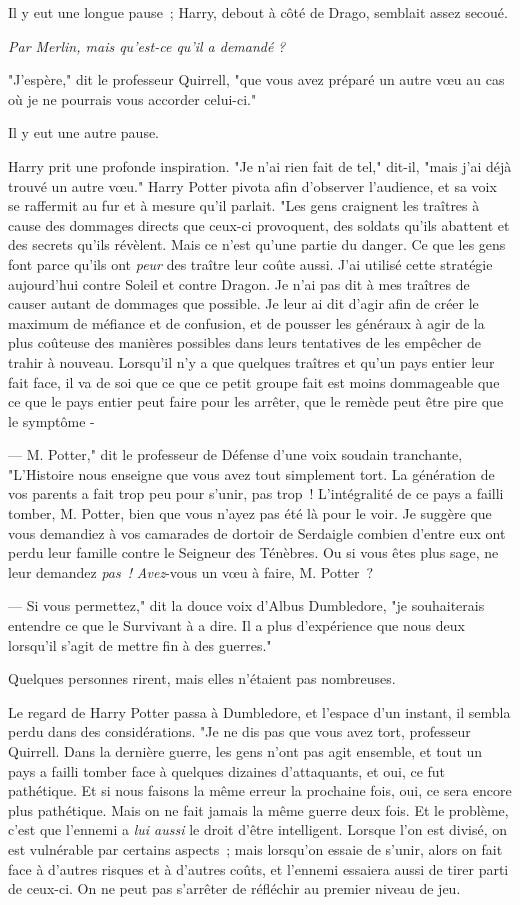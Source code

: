 Il y eut une longue pause~; Harry, debout à côté de Drago, semblait assez secoué.

\emph{Par Merlin, mais qu'est-ce qu'il a demandé} \emph{?}

"J'espère," dit le professeur Quirrell, "que vous avez préparé un autre vœu au cas où je ne pourrais vous accorder celui-ci."

Il y eut une autre pause.

Harry prit une profonde inspiration. "Je n'ai rien fait de tel," dit-il, "mais j'ai déjà trouvé un autre vœu." Harry Potter pivota afin d'observer l'audience, et sa voix se raffermit au fur et à mesure qu'il parlait. "Les gens craignent les traîtres à cause des dommages directs que ceux-ci provoquent, des soldats qu'ils abattent et des secrets qu'ils révèlent. Mais ce n'est qu'une partie du danger. Ce que les gens font parce qu'ils ont \emph{peur} des traître leur coûte aussi. J'ai utilisé cette stratégie aujourd'hui contre Soleil et contre Dragon. Je n'ai pas dit à mes traîtres de causer autant de dommages que possible. Je leur ai dit d'agir afin de créer le maximum de méfiance et de confusion, et de pousser les généraux à agir de la plus coûteuse des manières possibles dans leurs tentatives de les empêcher de trahir à nouveau. Lorsqu'il n'y a que quelques traîtres et qu'un pays entier leur fait face, il va de soi que ce que ce petit groupe fait est moins dommageable que ce que le pays entier peut faire pour les arrêter, que le remède peut être pire que le symptôme -

--- M. Potter," dit le professeur de Défense d'une voix soudain tranchante, "L'Histoire nous enseigne que vous avez tout simplement tort. La génération de vos parents a fait trop peu pour s'unir, pas trop~! L'intégralité de ce pays a failli tomber, M. Potter, bien que vous n'ayez pas été là pour le voir. Je suggère que vous demandiez à vos camarades de dortoir de Serdaigle combien d'entre eux ont perdu leur famille contre le Seigneur des Ténèbres. Ou si vous êtes plus sage, ne leur demandez \emph{pas~!} \emph{Avez}-vous un vœu à faire, M. Potter~?

--- Si vous permettez," dit la douce voix d'Albus Dumbledore, "je souhaiterais entendre ce que le Survivant à a dire. Il a plus d'expérience que nous deux lorsqu'il s'agit de mettre fin à des guerres."

Quelques personnes rirent, mais elles n'étaient pas nombreuses.

Le regard de Harry Potter passa à Dumbledore, et l'espace d'un instant, il sembla perdu dans des considérations. "Je ne dis pas que vous avez tort, professeur Quirrell. Dans la dernière guerre, les gens n'ont pas agit ensemble, et tout un pays a failli tomber face à quelques dizaines d'attaquants, et oui, ce fut pathétique. Et si nous faisons la même erreur la prochaine fois, oui, ce sera encore plus pathétique. Mais on ne fait jamais la même guerre deux fois. Et le problème, c'est que l'ennemi a \emph{lui aussi} le droit d'être intelligent. Lorsque l'on est divisé, on est vulnérable par certains aspects~; mais lorsqu'on essaie de s'unir, alors on fait face à d'autres risques et à d'autres coûts, et l'ennemi essaiera aussi de tirer parti de ceux-ci. On ne peut pas s'arrêter de réfléchir au premier niveau de jeu.

